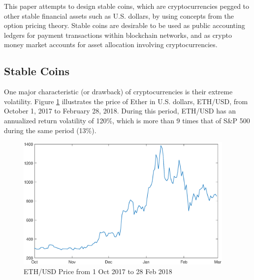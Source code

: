 \documentclass[11pt]{article}%
\numberwithin{equation}{section}
\theoremstyle{plain}
\begin{document}



This paper attempts to design stable coins, which are cryptocurrencies pegged to other stable financial assets such as U.S. dollars, by using concepts from the option pricing theory.  Stable coins are desirable to be used as public accounting ledgers for payment transactions within  blockchain networks, and as crypto money market accounts for asset allocation involving cryptocurrencies.


\subsection{Stable Coins}

One major characteristic (or drawback) of cryptocurrencies is their extreme volatility.
Figure \ref{fig:ethprice} illustrates the price of Ether in U.S. dollars, ETH/USD, from October 1, 2017 to February 28, 2018. During this period, ETH/USD has an annualized return volatility of 120\%, which is more than 9 times that of S\&P 500 during the same period (13\%).





\begin{figure}[!htb]
\begin{centering}
\includegraphics[width=0.95\textwidth]{eth_price}
\par\end{centering}
\caption{ETH/USD Price from 1 Oct 2017 to 28 Feb 2018}\label{fig:ethprice}
\end{figure}
\end{document}
